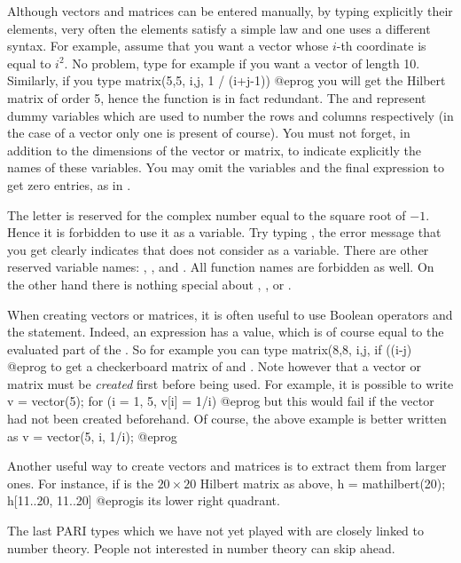 Although vectors and matrices can be entered manually, by typing explicitly
their elements, very often the elements satisfy a simple law and one uses a
different syntax. For example, assume that you want a vector whose $i$-th
coordinate is equal to $i^2$. No problem, type for example
 if you want a vector of length 10. Similarly, if
you type
\bprog
  matrix(5,5, i,j, 1 / (i+j-1))
@eprog\noindent
you will get the Hilbert matrix of order 5, hence the 
function is in fact redundant.  The  and  represent dummy
variables which are used to number the rows and columns respectively (in
the case of a vector only one is present of course). You must not forget,
in addition to the dimensions of the vector or matrix, to indicate
explicitly the names of these variables. You may omit the variables and
the final expression to get zero entries, as in .

 The letter  is reserved for the complex number
equal to the square root of $-1$. Hence it is forbidden to use it as a
variable. Try typing , the error message that you
get clearly indicates that  does not consider  as a variable.
There are other reserved variable names: , ,
 and . All function names are forbidden as well. On the
other hand there is nothing special about , ,  or
.

When creating vectors or matrices, it is often useful to use Boolean
operators and the  statement. Indeed, an  expression has a
value, which is of course equal to the evaluated part of the . So for
example you can type
\bprog
  matrix(8,8, i,j, if ((i-j)%
@eprog\noindent
to get a checkerboard matrix of  and . Note however
that a vector or matrix must be \emph{created} first before being used. For
example, it is possible to write
\bprog
  v = vector(5);
  for (i = 1, 5, v[i] = 1/i)
@eprog\noindent
but this would fail if the vector  had not been created beforehand.
Of course, the above example is better written as
\bprog
  v = vector(5, i, 1/i);
@eprog

Another useful way to create vectors and matrices is to extract them from
larger ones. For instance, if  is the $20\times 20$ Hilbert matrix as above,
\bprog
  h = mathilbert(20);
  h[11..20, 11..20]
@eprog\noindent is its lower right quadrant.

\medskip The last PARI types which we have not yet played with are closely
linked to number theory. People not interested in number theory can skip
ahead.


